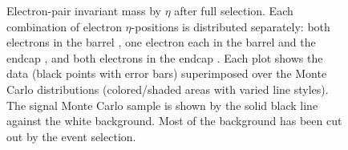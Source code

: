  \begin{figure}[htb]
  \begin{center}
  \end{center}
  \caption[\fixspacing Electron-pair invariant mass by $\eta$]{
    \fixspacing Electron-pair invariant mass by $\eta$ after full selection.
    Each combination of electron $\eta$-positions is 
    distributed separately: 
    both electrons in the barrel 
    , 
    one electron each in the barrel and the endcap 
    ,
    and both electrons in the endcap 
    .
    Each plot shows the data (black points with error bars) superimposed over the Monte Carlo 
    distributions (colored/shaded areas with varied line styles).  
    The signal Monte Carlo sample is shown by the solid black line against the white background.  
    Most of the background has been cut out by the event selection.  
  }
  \label{fig:InvMassEtaDiv}
 \end{figure}

